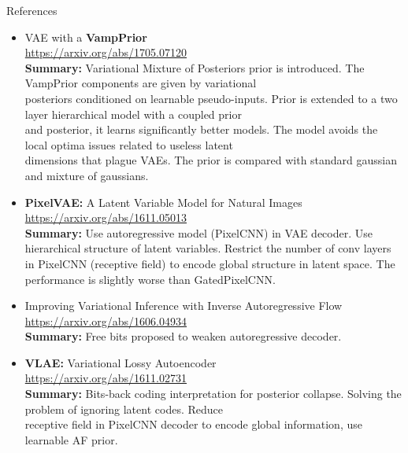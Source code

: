 \begin{frame}{References}
{\tiny
\begin{itemize}
	
	\item VAE with a \textbf{VampPrior} \\
	\href{https://arxiv.org/abs/1705.07120}{https://arxiv.org/abs/1705.07120} \\
	\textbf{Summary:} Variational Mixture of Posteriors prior is introduced. The VampPrior components are given by variational \\ posteriors conditioned on learnable pseudo-inputs. Prior is extended to a two layer hierarchical model with a coupled prior \\ and posterior, it learns significantly better models. The model avoids the local optima issues related to useless latent \\ dimensions that plague VAEs. The prior is compared with standard gaussian and mixture of gaussians.
	
    \item \textbf{PixelVAE:} A Latent Variable Model for Natural Images \\
    \href{https://arxiv.org/abs/1611.05013}{https://arxiv.org/abs/1611.05013} \\
    \textbf{Summary:} Use autoregressive model (PixelCNN) in VAE decoder. Use hierarchical structure of latent variables. Restrict the number of conv layers in PixelCNN (receptive field) to encode global structure in latent space. The performance is slightly worse than GatedPixelCNN.
    
    \item Improving Variational Inference with Inverse Autoregressive Flow \\
    \href{https://arxiv.org/abs/1606.04934}{https://arxiv.org/abs/1606.04934} \\
    \textbf{Summary:} Free bits proposed to weaken autoregressive decoder.
    
    \item \textbf{VLAE:} Variational Lossy Autoencoder \\
    \href{https://arxiv.org/abs/1611.02731}{https://arxiv.org/abs/1611.02731} \\
    \textbf{Summary:} Bits-back coding interpretation for posterior collapse. Solving the problem of ignoring latent codes. Reduce \\ receptive field in PixelCNN decoder to encode global information, use learnable AF prior.
    

\end{itemize}}
\end{frame}
